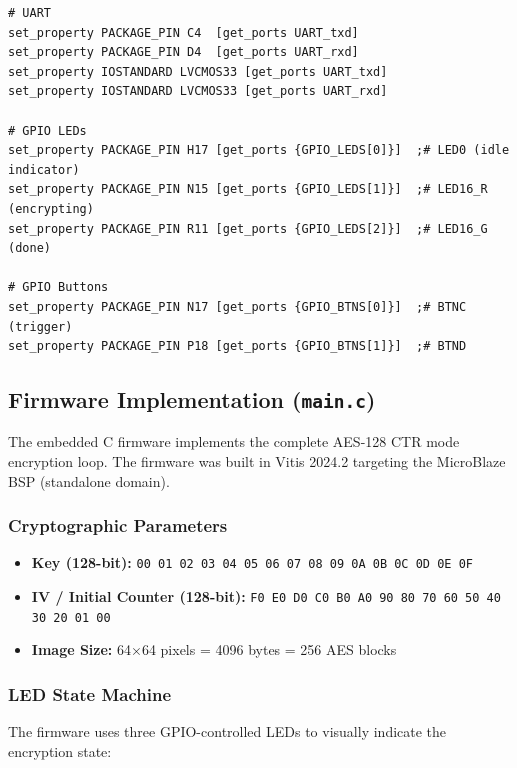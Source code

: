 \begin{lstlisting}[style=tclstyle, caption={Key XDC Pin Assignments for Nexys 4 DDR}]
# UART
set_property PACKAGE_PIN C4  [get_ports UART_txd]
set_property PACKAGE_PIN D4  [get_ports UART_rxd]
set_property IOSTANDARD LVCMOS33 [get_ports UART_txd]
set_property IOSTANDARD LVCMOS33 [get_ports UART_rxd]

# GPIO LEDs
set_property PACKAGE_PIN H17 [get_ports {GPIO_LEDS[0]}]  ;# LED0 (idle indicator)
set_property PACKAGE_PIN N15 [get_ports {GPIO_LEDS[1]}]  ;# LED16_R (encrypting)
set_property PACKAGE_PIN R11 [get_ports {GPIO_LEDS[2]}]  ;# LED16_G (done)

# GPIO Buttons
set_property PACKAGE_PIN N17 [get_ports {GPIO_BTNS[0]}]  ;# BTNC (trigger)
set_property PACKAGE_PIN P18 [get_ports {GPIO_BTNS[1]}]  ;# BTND
\end{lstlisting}

\subsection{Firmware Implementation (\texttt{main.c})}

The embedded C firmware implements the complete AES-128 CTR mode encryption loop. The firmware was built in Vitis 2024.2 targeting the MicroBlaze BSP (standalone domain).

\subsubsection{Cryptographic Parameters}

\begin{itemize}[leftmargin=*]
    \item \textbf{Key (128-bit):} \texttt{00 01 02 03 04 05 06 07 08 09 0A 0B 0C 0D 0E 0F}
    \item \textbf{IV / Initial Counter (128-bit):} \texttt{F0 E0 D0 C0 B0 A0 90 80 70 60 50 40 30 20 01 00}
    \item \textbf{Image Size:} 64$\times$64 pixels = 4096 bytes = 256 AES blocks
\end{itemize}

\subsubsection{LED State Machine}

The firmware uses three GPIO-controlled LEDs to visually indicate the encryption state:

